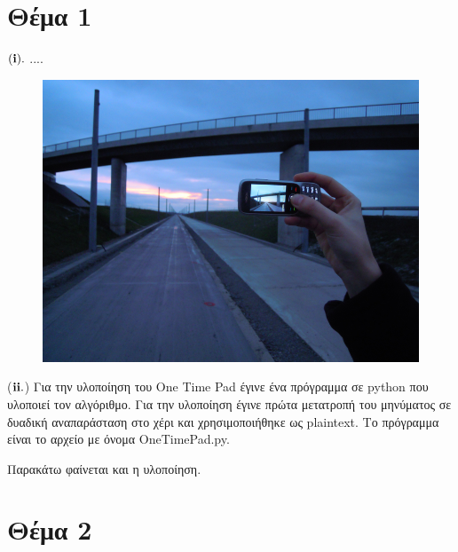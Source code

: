 \documentclass[12pt]{article}
\begin{document}
\section*{{\color{maroon}Θέμα 1}}
$({\bf i}).$ ....
\par
\begin{figure}[h]
\centering 
\includegraphics[width=1\linewidth]{1.png}
\end{figure}
\clearpage
(${\bf ii}.$) Για την υλοποίηση του One Time Pad έγινε ένα πρόγραμμα σε python που υλοποιεί τον αλγόριθμο. Για την υλοποίηση έγινε πρώτα μετατροπή του μηνύματος σε δυαδική αναπαράσταση στο χέρι και χρησιμοποιήθηκε ως plaintext. Το πρόγραμμα είναι το αρχείο με όνομα OneTimePad.py.
\par Παρακάτω φαίνεται και η υλοποίηση.
\begin{figure}[h]
\centering 
\end{figure}

\section*{{\color{maroon}Θέμα 2}}

%


\end{document}
